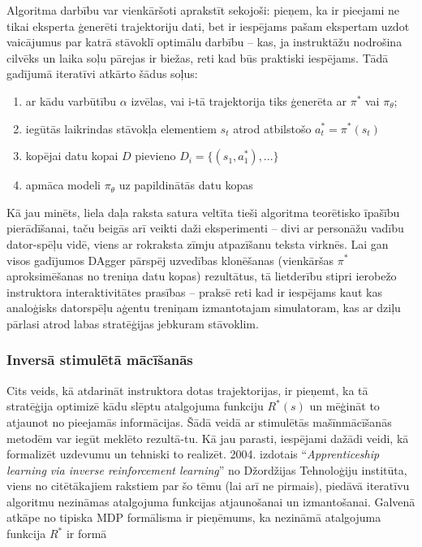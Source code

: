 \documentclass[12pt, a4paper]{article}
\numberwithin{equation}{section} %
\begin{document}
Algoritma darbību var vienkāršoti aprakstīt sekojoši: pieņem, ka ir pieejami ne tikai eksperta ģenerēti trajektoriju dati, bet ir iespējams pašam ekspertam uzdot vaicājumus par katrā stāvoklī optimālu darbību -- kas, ja instruktāžu nodrošina cilvēks un laika soļu pārejas ir biežas, reti kad būs praktiski iespējams. Tādā gadījumā iteratīvi atkārto šādus soļus:

\begin{enumerate}
    \item ar kādu varbūtību $\alpha$ izvēlas, vai i-tā trajektorija tiks ģenerēta ar $\pi^*$ vai $\pi_{\theta}$;
    \item iegūtās laikrindas stāvokļa elementiem $s_t$ atrod atbilstošo $a^*_t=\pi^*(s_t)$ 
    \item kopējai datu kopai $D$ pievieno $D_i=\lbrace (s_1, a^*_1),... \rbrace$
    \item apmāca modeli $\pi_{\theta}$ uz papildinātās datu kopas
\end{enumerate}

Kā jau minēts, liela daļa raksta satura veltīta tieši algoritma teorētisko īpašību pierādīšanai, taču beigās arī veikti daži eksperimenti -- divi ar personāžu vadību dator-spēļu vidē, viens ar rokraksta zīmju atpazīšanu teksta virknēs. Lai gan visos gadījumos DAgger pārspēj uzvedības klonēšanas (vienkāršas $\pi^*$ aproksimēšanas no treniņa datu kopas) rezultātus, tā lietderību stipri ierobežo instruktora interaktivitātes prasības -- praksē reti kad ir iespējams kaut kas analoģisks datorspēļu aģentu treniņam izmantotajam simulatoram, kas ar dziļu pārlasi atrod labas stratēģijas jebkuram stāvoklim.

\subsubsection{Inversā stimulētā mācīšanās}

Cits veids, kā atdarināt instruktora dotas trajektorijas, ir pieņemt, ka tā stratēģija optimizē kādu slēptu atalgojuma funkciju $R^*(s)$ un mēģināt to atjaunot no pieejamās informācijas. Šādā veidā ar stimulētās mašīnmācīšanās metodēm var iegūt meklēto rezultā-tu. Kā jau parasti, iespējami dažādi veidi, kā formalizēt uzdevumu un tehniski to realizēt. 2004. izdotais ``\textit{Apprenticeship learning via inverse reinforcement learning}'' \cite{abbeel2004apprenticeship} no Džordžijas Tehnoloģiju institūta, viens no citētākajiem rakstiem par šo tēmu (lai arī ne pirmais), piedāvā iteratīvu algoritmu nezināmas atalgojuma funkcijas atjaunošanai un izmantošanai. Galvenā atkāpe no tipiska MDP formālisma ir pieņēmums, ka nezināmā atalgojuma funkcija $R^*$ ir formā
\end{document}
